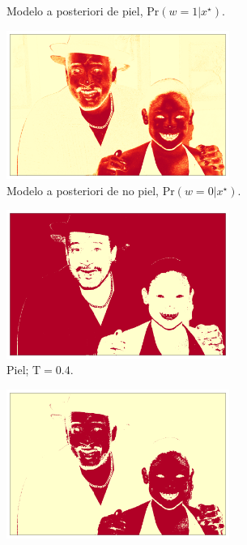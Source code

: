 \begin{figure}[ht!]
\begin{subfigure}{0.4\textwidth}
        \caption{Modelo a posteriori de piel, $\text{Pr}(w=1 | x^{\star})$.}
    \end{subfigure}
    \hspace{1cm}
    \begin{subfigure}{0.4\textwidth}
        \centering
        \includegraphics[width=0.8\textwidth]{../figures/image3/image_03_postbg.png}
        \caption{Modelo a posteriori de no piel, $\text{Pr}(w=0 | x^{\star})$.}
    \end{subfigure}
    \begin{subfigure}{0.4\textwidth}
        \centering
        \includegraphics[width=0.8\textwidth]{../figures/image3/image_03_treshskin_40percent.png}
        \caption{Piel; $\text{T} = 0.4$.}
    \end{subfigure}
    \hspace{1cm}
    \begin{subfigure}{0.4\textwidth}
        \centering
        \includegraphics[width=0.8\textwidth]{../figures/image3/image_03_treshbg_40percent.png}

\end{subfigure}
\end{figure}
